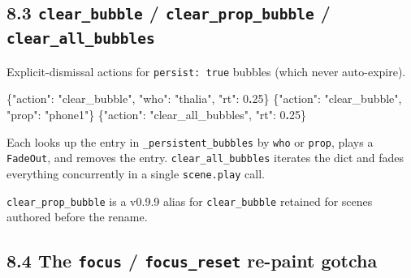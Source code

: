 \documentclass[
  11pt,
]{book}
\newenvironment{Shaded}{}{}
\newcommand{\DataTypeTok}[1]{\textcolor[rgb]{0.56,0.13,0.00}{#1}}
\newcommand{\DecValTok}[1]{\textcolor[rgb]{0.25,0.63,0.44}{#1}}
\newcommand{\ErrorTok}[1]{\textcolor[rgb]{1.00,0.00,0.00}{\textbf{#1}}}
\newcommand{\FunctionTok}[1]{\textcolor[rgb]{0.02,0.16,0.49}{#1}}
\newcommand{\StringTok}[1]{\textcolor[rgb]{0.25,0.44,0.63}{#1}}
\begin{document}
\subsection{\texorpdfstring{8.3 \texttt{clear\_bubble} /
\texttt{clear\_prop\_bubble} /
\texttt{clear\_all\_bubbles}}{8.3 clear\_bubble / clear\_prop\_bubble / clear\_all\_bubbles}}\label{clear_bubble-clear_prop_bubble-clear_all_bubbles}

Explicit-dismissal actions for \texttt{persist:\ true} bubbles (which
never auto-expire).

\begin{Shaded}
\begin{Highlighting}[]
\FunctionTok{\{}\DataTypeTok{"action"}\FunctionTok{:} \StringTok{"clear\_bubble"}\FunctionTok{,} \DataTypeTok{"who"}\FunctionTok{:} \StringTok{"thalia"}\FunctionTok{,} \DataTypeTok{"rt"}\FunctionTok{:} \DecValTok{0}\ErrorTok{.}\DecValTok{25}\FunctionTok{\}}
\FunctionTok{\{}\DataTypeTok{"action"}\FunctionTok{:} \StringTok{"clear\_bubble"}\FunctionTok{,} \DataTypeTok{"prop"}\FunctionTok{:} \StringTok{"phone1"}\FunctionTok{\}}
\FunctionTok{\{}\DataTypeTok{"action"}\FunctionTok{:} \StringTok{"clear\_all\_bubbles"}\FunctionTok{,} \DataTypeTok{"rt"}\FunctionTok{:} \DecValTok{0}\ErrorTok{.}\DecValTok{25}\FunctionTok{\}}
\end{Highlighting}
\end{Shaded}

Each looks up the entry in \texttt{\_persistent\_bubbles} by
\texttt{who} or \texttt{prop}, plays a \texttt{FadeOut}, and removes the
entry. \texttt{clear\_all\_bubbles} iterates the dict and fades
everything concurrently in a single \texttt{scene.play} call.

\texttt{clear\_prop\_bubble} is a v0.9.9 alias for
\texttt{clear\_bubble} retained for scenes authored before the rename.


\subsection{\texorpdfstring{8.4 The \texttt{focus} / \texttt{focus\_reset}
re-paint gotcha}{8.4 The focus / focus\_reset re-paint
gotcha}}\label{the-focus_reset-overlay-gotcha}
\end{document}
